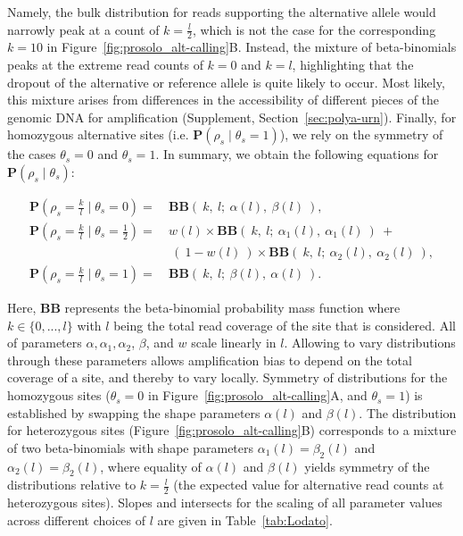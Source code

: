\documentclass[fleqn,12pt,inline]{wlscirep}
\newcommand{\Prob}{{\mathbf{P}}}
\newcommand{\cB}{{\mathbf{B}}}
\begin{document}
Namely, the bulk distribution for reads supporting the alternative allele would narrowly peak at a count of $k=\frac{l}{2}$, which is not the case for the corresponding $k=10$ in Figure~\ref{fig:prosolo_alt-calling}B.
Instead, the mixture of beta-binomials peaks at the extreme read counts of $k=0$ and $k=l$, highlighting that the dropout of the alternative or reference allele is quite likely to occur.
Most likely, this mixture arises from differences in the accessibility of different pieces of the genomic DNA for amplification\cite{picher_trueprime_2016} (Supplement, Section~\ref{sec:polya-urn}).
Finally, for homozygous alternative sites (i.e. $\mathbf{P}(\rho_s\mid\theta_s=1)$), we rely on the symmetry of the cases $\theta_s=0$ and $\theta_s=1$.
In summary, we obtain the following equations for $\mathbf{P}(\rho_s\mid\theta_s)$:

\begin{equation}
	\label{eq:BBLodato}
	\begin{split}
		\Prob(\rho_s = \frac{k}{l} \mid \theta_s = 0 ) 			=~ &\cB\cB(~ k,~ l;~ \alpha(l),~ \beta(l)~ ),\\
		\Prob(\rho_s = \frac{k}{l} \mid \theta_s = \frac12) =~ &w(l) \times \cB\cB(~ k,~ l;~ \alpha_1(l),~ \alpha_1(l)~ )~ +\\
                                                       ~&~(~ 1-w(l)~ ) \times \cB\cB(~ k,~ l;~ \alpha_2(l),~ \alpha_2(l)~ ),\\
		\Prob(\rho_s = \frac{k}{l} \mid \theta_s = 1 ) 			=~ &\cB\cB(~ k,~ l;~ \beta(l),~ \alpha(l)~ ).
	\end{split}
\end{equation}

Here, $\cB\cB$ represents the beta-binomial probability mass function where $k\in\{0,...,l\}$ with $l$ being the total read coverage of the site that is considered. All of parameters $\alpha, \alpha_1,\alpha_2$, $\beta$, and $w$ scale linearly in $l$.
Allowing to vary distributions through these parameters allows amplification bias to depend on the total coverage of a site, and thereby to vary locally.
Symmetry of distributions for the homozygous sites ($\theta_s = 0$ in Figure~\ref{fig:prosolo_alt-calling}A, and $\theta_s = 1$) is established by swapping the shape parameters $\alpha(l)$ and $\beta(l)$.
The distribution for heterozygous sites (Figure~\ref{fig:prosolo_alt-calling}B) corresponds to a mixture of two beta-binomials with shape parameters $\alpha_1(l)=\beta_2(l)$ and $\alpha_2(l)=\beta_2(l)$, where equality of $\alpha(l)$ and $\beta(l)$ yields symmetry of the distributions relative to $k = \frac{l}{2}$ (the expected value for alternative read counts at heterozygous sites).
Slopes and intersects for the scaling of all parameter values across different choices of $l$ are given in Table~\ref{tab:Lodato}.
\end{document}
